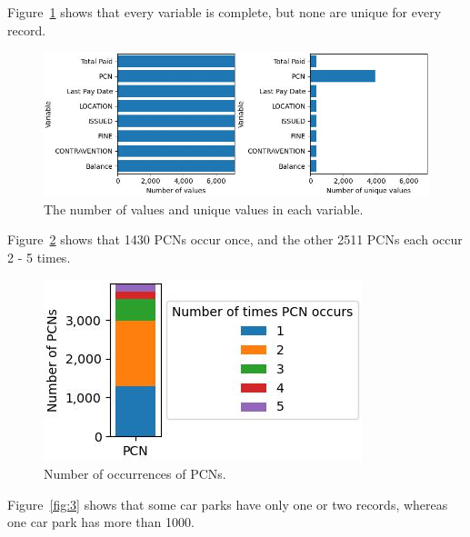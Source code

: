 \documentclass{article}
\begin{document}
Figure~\ref{fig:1} shows that every variable is complete, but none are unique for every record.

\begin{figure}[h!]
  \includegraphics[width=\linewidth]{numvals_uniquevals.jpg}
  \caption{The number of values and unique values in each variable.}
  \label{fig:1}
\end{figure}

Figure~\ref{fig:2} shows that 1430 PCNs occur once, and the other 2511 PCNs each occur 2 - 5 times.

\begin{figure}[h!]
  \includegraphics[width=\linewidth]{value_counts PCN.jpg}
  \caption{Number of occurrences of PCNs.}
  \label{fig:2}
\end{figure}

Figure~\ref{fig:3} shows that some car parks have only one or two records, whereas one car park has more than 1000.
\end{document}
